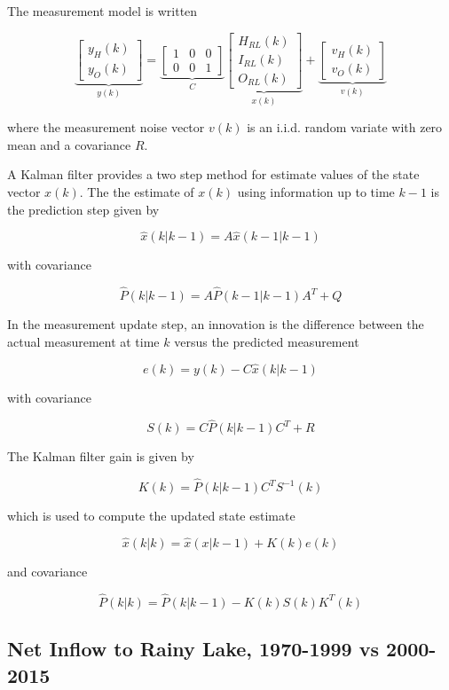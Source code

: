 \documentclass[preprint,times]{elsarticle}
\begin{document}
The measurement model is written

$$\underbrace{\left[\begin{array}{c} y_H(k) \\ y_O(k) \end{array}\right]}_{y(k)} = \underbrace{\left[\begin{array}{ccc} 1 & 0 & 0 \\ 0 & 0 & 1 \end{array}\right]}_{C} \underbrace{\left[\begin{array}{c} H_{RL}(k) \\ I_{RL}(k) \\ O_{RL}(k) \end{array}\right]}_{x(k)} +  \underbrace{\left[\begin{array}{c}  v_{H}(k) \\ v_{O}(k) \end{array}\right]}_{v(k)} $$

\noindent
where the measurement noise vector $v(k)$ is an i.i.d. random variate with zero mean and a covariance $R$.

A Kalman filter provides a two step method for estimate values of the state vector $x(k)$. The the estimate of $x(k)$ using information up to time $k-1$ is the prediction step given by 

$$\hat{x}(k|k-1) = A \hat{x}(k-1|k-1)$$

\noindent
with covariance

$$\hat{P}(k|k-1) = A \hat{P}(k-1|k-1) A^T + Q$$

In the measurement update step, an innovation is the difference between the actual measurement at time $k$ versus the predicted measurement

$$e(k) = y(k) - C \hat{x}(k|k-1)$$

\noindent
with covariance

$$S(k) = C\hat{P}(k|k-1)C^T + R$$

\noindent
The Kalman filter gain is given by

$$K(k) = \hat{P}(k|k-1)C^TS^{-1}(k)$$

\noindent
which is used to compute the updated state estimate

$$\hat{x}(k|k) = \hat{x}(x|k-1) + K(k)e(k)$$

and covariance

$$\hat{P}(k|k) = \hat{P}(k|k-1) - K(k)S(k)K^T(k)$$

\subsection{Net Inflow to Rainy Lake, 1970-1999 vs 2000-2015}
\end{document}
